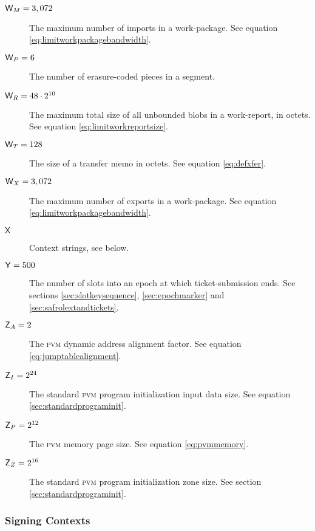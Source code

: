 \begin{description}
  \item[$\mathsf{W}_M = 3,072$] The maximum number of imports in a work-package. See equation \ref{eq:limitworkpackagebandwidth}.
  \item[$\mathsf{W}_P = 6$] The number of erasure-coded pieces in a segment.
  \item[$\mathsf{W}_R = 48\cdot2^{10}$] The maximum total size of all unbounded blobs in a work-report, in octets. See equation \ref{eq:limitworkreportsize}.
  \item[$\mathsf{W}_T = 128$] The size of a transfer memo in octets. See equation \ref{eq:defxfer}.
  \item[$\mathsf{W}_X = 3,072$] The maximum number of exports in a work-package. See equation \ref{eq:limitworkpackagebandwidth}.
  \item[$\mathsf{X}$] Context strings, see below.
  \item[$\mathsf{Y} = 500$] The number of slots into an epoch at which ticket-submission ends. See sections \ref{sec:slotkeysequence}, \ref{sec:epochmarker} and \ref{sec:safrolextandtickets}.
  \item[$\mathsf{Z}_A = 2$] The \textsc{pvm} dynamic address alignment factor. See equation \ref{eq:jumptablealignment}.
  \item[$\mathsf{Z}_I = 2^{24}$] The standard \textsc{pvm} program initialization input data size. See equation \ref{sec:standardprograminit}.
  \item[$\mathsf{Z}_P = 2^{12}$] The \textsc{pvm} memory page size. See equation \ref{eq:pvmmemory}.
  \item[$\mathsf{Z}_Z = 2^{16}$] The standard \textsc{pvm} program initialization zone size. See section \ref{sec:standardprograminit}.
\end{description}

\subsubsection{Signing Contexts}

